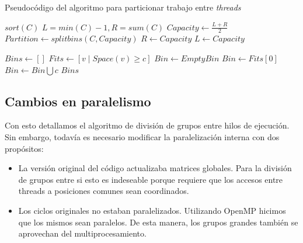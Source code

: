 \begin{algorithm}[H]
    \caption{Pseudoc\'odigo del algoritmo para particionar trabajo entre \textit{threads}}
    \label{algo:partition-algo}
    \begin{algorithmic}
            \State $sort(C)$
            \State $L = min(C)-1, R = sum(C)$
                \Comment{Invariante: $(L, \dots, R]$ contiene la capacidad m\'axima.}
                \State $Capacity \gets \frac{L+R}{2}$
                \State $Partition \gets splitbins(C,Capacity)$
                    \State $R \gets Capacity$
                \Else
                    \State $L \gets Capacity$
                \EndIf
            \EndWhile

            \State {}
        \EndFunction

            \State $Bins \gets []$
                \State $Fits \gets [v \mid Space(v) \geq c]$
                    \State $Bin \gets EmptyBin$
                \Else
                    \State $Bin \gets Fits[0]$
                \EndIf
                \State $Bin \gets Bin \bigcup c$
            \EndFor
            \State \Return $Bins$
        \EndFunction
    \end{algorithmic}
\end{algorithm}

\subsection{Cambios en paralelismo}

Con esto detallamos el algoritmo de divisi\'on de grupos entre hilos de ejecuci\'on.
Sin embargo, todav\'ia es necesario modificar la paralelizaci\'on interna con dos
prop\'ositos:

\begin{itemize}
    \item La versi\'on original del c\'odigo actualizaba matrices globales. Para
    la divisi\'on de grupos entre si esto es indeseable porque requiere que los
    accesos entre threads a posiciones comunes sean coordinados.
    \item Los ciclos originales no estaban paralelizados. Utilizando OpenMP
    hicimos que los mismos sean paralelos. De esta manera, los grupos grandes
    tambi\'en se aprovechan del multiprocesamiento.
\end{itemize}

